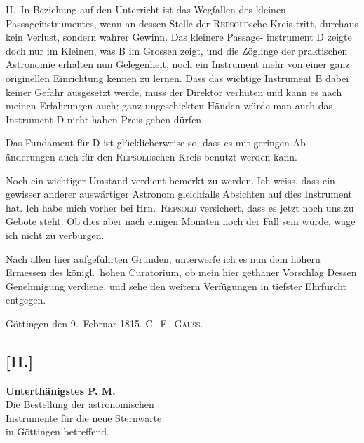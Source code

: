 \documentclass[12pt,a4paper]{article}
\theoremstyle{plain}
\theoremstyle{definition}
\theoremstyle{remark}
\begin{document}
II.\ In Beziehung auf den Unterricht ist das Wegfallen des kleinen
Passageinstrumentes, wenn an dessen Stelle der \textsc{Repsold}sche Kreis tritt,
durchaus kein Verlust, sondern wahrer Gewinn. Das kleinere Passage-
instrument D zeigte doch nur im Kleinen, was B im Grossen zeigt, und die
Z\"{o}glinge der praktischen Astronomie erhalten nun Gelegenheit, noch ein
Instrument mehr von einer ganz originellen Einrichtung kennen zu lernen.
Dass das wichtige Instrument B dabei keiner Gefahr ausgesetzt werde, muss
der Direktor verh\"{u}ten und kann es nach meinen Erfahrungen auch; ganz
ungeschickten H\"{a}nden w\"{u}rde man auch das Instrument D nicht haben Preis
geben d\"{u}rfen.

Das Fundament f\"{u}r D ist gl\"{u}cklicherweise so, dass es mit geringen Ab-
\"{a}nderungen auch f\"{u}r den \textsc{Repsold}schen Kreis benutzt werden kann.

Noch ein wichtiger Umstand verdient bemerkt zu werden. Ich weiss,
dass ein gewisser anderer ausw\"{a}rtiger Astronom gleichfalls Absichten auf dies
Instrument hat. Ich habe mich vorher bei Hrn.\ \textsc{Repsold} versichert, dass es
jetzt noch uns zu Gebote steht. Ob dies aber nach einigen Monaten noch
der Fall sein w\"{u}rde, wage ich nicht zu verb\"{u}rgen.

Nach allen hier aufgef\"{u}hrten Gr\"{u}nden, unterwerfe ich es nun dem h\"{o}hern
Ermessen des k\"{o}nigl.\ hohen Curatorium, ob mein hier gethaner Vorschlag
Dessen Genehmigung verdiene, und sehe den weitern Verf\"{u}gungen in tiefster
Ehrfurcht entgegen.

\begin{flushright}
G\"{o}ttingen den 9.\ Februar 1815. \hspace{2em} C.\ F.\ \textsc{Gauss}.
\end{flushright}

\subsection*{[II.]}

\begin{center}
\textbf{Unterth\"{a}nigstes P. M.}\\[0.5em]
Die Bestellung der astronomischen\\
Instrumente f\"{u}r die neue Sternwarte\\
in G\"{o}ttingen betreffend.
\end{center}
\end{document}
